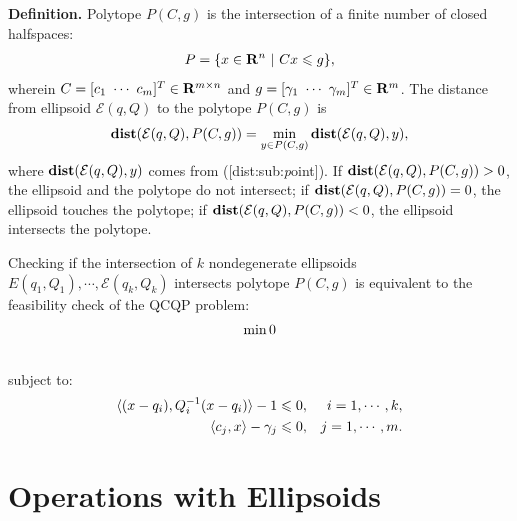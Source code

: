 \documentclass[letterpaper,10pt,english]{sphinxmanual}
\begin{document}
\textbf{Definition.} Polytope $P(C,g)$ is the
intersection of a finite number of closed halfspaces:
\label{chap_ellcalc:equation-polytope}\begin{gather}
\begin{split}P = \{x\in{\bf R}^n ~|~ Cx\leqslant g\},\end{split}\label{chap_ellcalc-polytope}
\end{gather}
wherein $C=[c_1 ~ \cdots ~ c_m]^T\in{\bf R}^{m\times n}$ and
$g=[\gamma_1 ~ \cdots ~ \gamma_m]^T\in{\bf R}^m$.
The distance
from ellipsoid ${\mathcal E}(q,Q)$ to the polytope $P(C,g)$
is
\label{chap_ellcalc:equation-dist_poly}\begin{gather}
\begin{split}{\bf dist}({\mathcal E}(q,Q),P(C,g))=\min_{y\in P(C,g)}{\bf dist}({\mathcal E}(q,Q),y),\end{split}\label{chap_ellcalc-dist_poly}
\end{gather}
where ${\bf dist}({\mathcal E}(q,Q),y)$ comes from
({[}dist:sub:\emph{p}oint{]}). If
${\bf dist}({\mathcal E}(q,Q),P(C,g))>0$, the ellipsoid and the
polytope do not intersect; if
${\bf dist}({\mathcal E}(q,Q),P(C,g))=0$, the ellipsoid touches
the polytope; if ${\bf dist}({\mathcal E}(q,Q),P(C,g))<0$, the
ellipsoid intersects the polytope.

Checking if the intersection of $k$ nondegenerate ellipsoids
$E(q_1,Q_1),\cdots,{\mathcal E}(q_k,Q_k)$ intersects polytope
$P(C,g)$ is equivalent to the feasibility check of the QCQP
problem:
\begin{gather}
\begin{split}\min 0\end{split}\notag\\\begin{split}\end{split}\notag
\end{gather}
subject to:
\begin{gather}
\begin{split}\begin{aligned}
\langle (x-q_i),Q_i^{-1}(x-q_i)\rangle - 1 \leqslant0, & & i=1,\cdots,k,\\
\langle c_j, x\rangle - \gamma_j \leqslant0, & & j=1,\cdots,m.\end{aligned}\end{split}\notag
\end{gather}

\section{Operations with Ellipsoids}
\label{chap_ellcalc:operations-with-ellipsoids}
\end{document}
